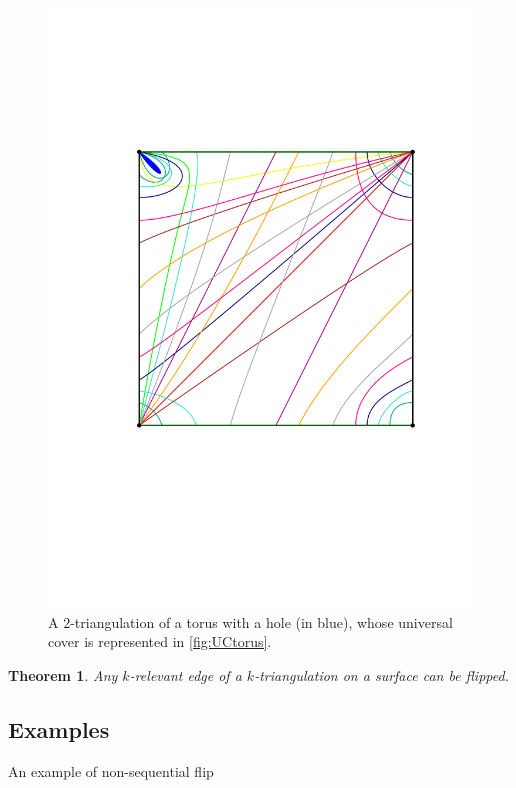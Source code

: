 \documentclass{amsart}
\newtheorem{theorem}{Theorem}[section]
\theoremstyle{remark}
\begin{document}
\begin{figure}[h]
	\capstart
	\centerline{\includegraphics[scale=.42]{exTorusSquare}}
	\caption{A $2$-triangulation of a torus with a hole (in blue), whose universal cover is represented in \cref{fig:UCtorus}.}
	\label{fig:torus}
\end{figure}

\begin{theorem}
\label{generalFlip}
Any $k$-relevant edge of a $k$-triangulation on a surface can be flipped.
\end{theorem}


\subsection{Examples}

An example of non-sequential flip
\end{document}
